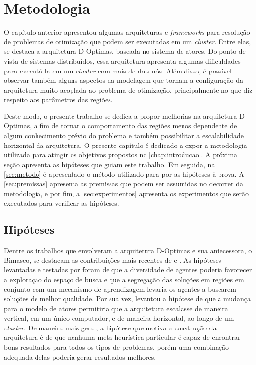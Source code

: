 \chapter{Metodologia}
\label{chap:metodologia}
O capítulo anterior apresentou algumas arquiteturas e \textit{frameworks} para resolução de problemas de otimização que podem ser executadas em um \textit{cluster}. Entre elas, se destaca a arquitetura D-Optimas, baseada no sistema de atores. Do ponto de vista de sistemas distribuídos, essa arquitetura apresenta algumas dificuldades para executá-la em um \textit{cluster} com mais de dois nós. Além disso, é possível observar também alguns aspectos da modelagem que tornam a configuração da arquitetura muito acoplada ao problema de otimização, principalmente no que diz respeito aos parâmetros das regiões.

Deste modo, o presente trabalho se dedica a propor melhorias na arquitetura D-Optimas, a fim de tornar o comportamento das regiões menos dependente de algum conhecimento prévio do problema e também possibilitar a escalabilidade horizontal da arquitetura. O presente capítulo é dedicado a expor a metodologia utilizada para atingir os objetivos propostos no \autoref{chap:introducao}. A próxima seção apresenta as hipóteses que guiam este trabalho. Em seguida, na \autoref{sec:metodo} é apresentado o método utilizado para por as hipóteses à prova. A \autoref{sec:premissas} apresenta as premissas que podem ser assumidas no decorrer da metodologia, e por fim, a \autoref{sec:experimentos} apresenta os experimentos que serão executados para verificar as hipóteses.


\section{Hipóteses}
\label{sec:hipoteses}
Dentre os trabalhos que envolveram a arquitetura D-Optimas e sua antecessora, o Bimasco, se destacam as contribuições mais recentes de  e . As hipóteses levantadas e testadas por  foram de que a diversidade de agentes poderia favorecer a exploração do espaço de busca e que a segregação das soluções em regiões em conjunto com um mecanismo de aprendizagem levaria os agentes a buscarem soluções de melhor qualidade. Por sua vez,  levantou a hipótese de que a mudança para o modelo de atores permitiria que a arquitetura escalasse de maneira vertical, em um único computador, e de maneira horizontal, ao longo de um \textit{cluster}. De maneira mais geral, a hipótese que motiva a construção da arquitetura é de que nenhuma meta-heurística particular é capaz de encontrar bons resultados para todos os tipos de problemas, porém uma combinação adequada delas poderia gerar resultados melhores. 

